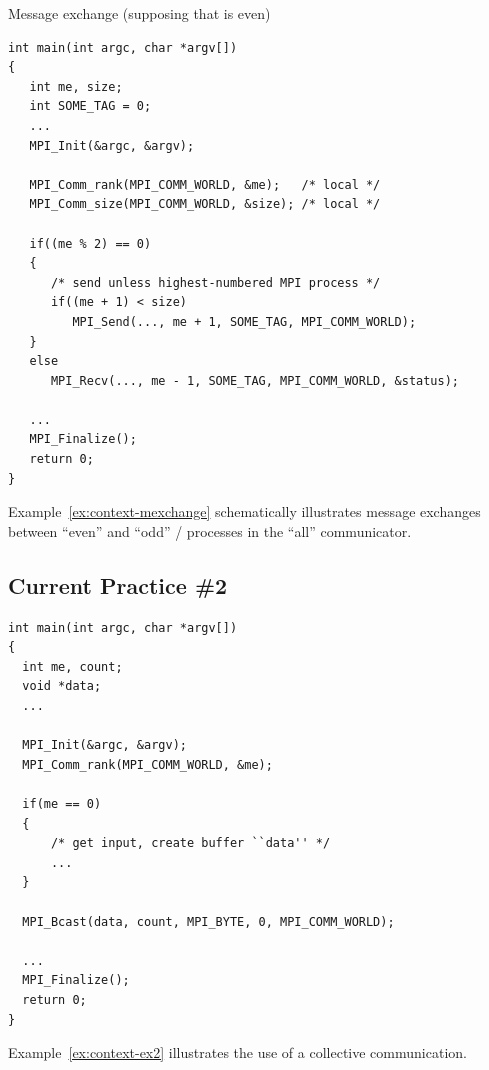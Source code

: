 \begin{example}
\noindent Message exchange (supposing that  is even)
\label{ex:context-mexchange}
\begin{lstlisting}[language={[MPI]C}]
int main(int argc, char *argv[])
{
   int me, size;
   int SOME_TAG = 0;
   ...
   MPI_Init(&argc, &argv);

   MPI_Comm_rank(MPI_COMM_WORLD, &me);   /* local */
   MPI_Comm_size(MPI_COMM_WORLD, &size); /* local */

   if((me % 2) == 0)
   {
      /* send unless highest-numbered MPI process */
      if((me + 1) < size)
         MPI_Send(..., me + 1, SOME_TAG, MPI_COMM_WORLD);
   }
   else
      MPI_Recv(..., me - 1, SOME_TAG, MPI_COMM_WORLD, &status);

   ...
   MPI_Finalize();
   return 0;
}
\end{lstlisting}
Example~\ref{ex:context-mexchange} schematically illustrates
message exchanges between ``even'' and ``odd'' \MPI/ processes in the ``all''
communicator.
\end{example}

\subsection{Current Practice \#2}
\begin{example}
\label{ex:context-ex2}
\begin{lstlisting}[language={[MPI]C}]
int main(int argc, char *argv[])
{
  int me, count;
  void *data;
  ...

  MPI_Init(&argc, &argv);
  MPI_Comm_rank(MPI_COMM_WORLD, &me);

  if(me == 0)
  {
      /* get input, create buffer ``data'' */
      ...
  }

  MPI_Bcast(data, count, MPI_BYTE, 0, MPI_COMM_WORLD);

  ...
  MPI_Finalize();
  return 0;
}
\end{lstlisting}
Example~\ref{ex:context-ex2} illustrates the use of a collective communication.
\end{example}


